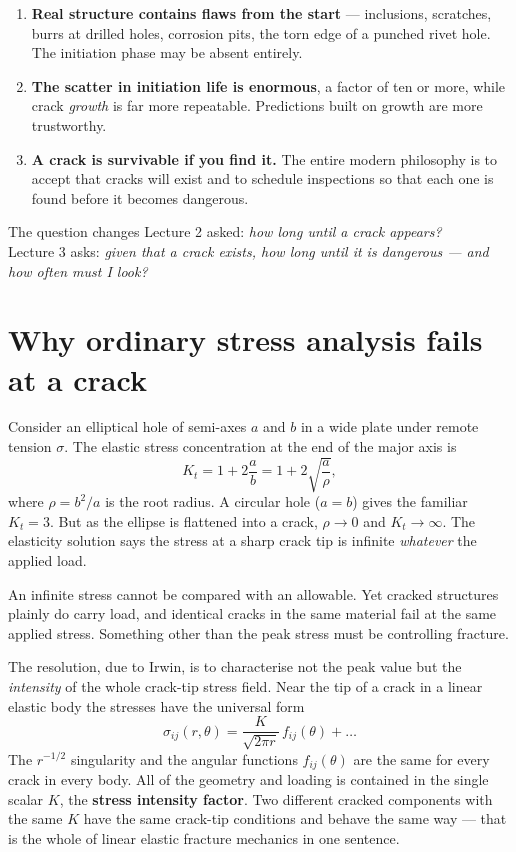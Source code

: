 \documentclass[11pt,a4paper]{article}
\begin{document}
\begin{enumerate}[nosep]
  \item \textbf{Real structure contains flaws from the start} --- inclusions, scratches, burrs at drilled holes, corrosion pits, the torn edge of a punched rivet hole. The initiation phase may be absent entirely.
  \item \textbf{The scatter in initiation life is enormous}, a factor of ten or more, while crack \emph{growth} is far more repeatable. Predictions built on growth are more trustworthy.
  \item \textbf{A crack is survivable if you find it.} The entire modern philosophy is to accept that cracks will exist and to schedule inspections so that each one is found before it becomes dangerous.
\end{enumerate}

\begin{keybox}{The question changes}
Lecture 2 asked: \emph{how long until a crack appears?} \\
Lecture 3 asks: \emph{given that a crack exists, how long until it is dangerous --- and how often must I look?}
\end{keybox}

\section{Why ordinary stress analysis fails at a crack}

Consider an elliptical hole of semi-axes $a$ and $b$ in a wide plate under remote tension $\sigma$. The elastic stress concentration at the end of the major axis is
\begin{equation}
  K_t = 1+2\frac{a}{b} = 1+2\sqrt{\frac{a}{\rho}},
\end{equation}
where $\rho=b^2/a$ is the root radius. A circular hole ($a=b$) gives the familiar $K_t=3$. But as the ellipse is flattened into a crack, $\rho\to0$ and $K_t\to\infty$. The elasticity solution says the stress at a sharp crack tip is infinite \emph{whatever} the applied load.

An infinite stress cannot be compared with an allowable. Yet cracked structures plainly do carry load, and identical cracks in the same material fail at the same applied stress. Something other than the peak stress must be controlling fracture.

The resolution, due to Irwin, is to characterise not the peak value but the \emph{intensity} of the whole crack-tip stress field. Near the tip of a crack in a linear elastic body the stresses have the universal form
\begin{equation}
  \sigma_{ij}(r,\theta)=\frac{K}{\sqrt{2\pi r}}\,f_{ij}(\theta)+\dots
  \label{eq:field}
\end{equation}
The $r^{-1/2}$ singularity and the angular functions $f_{ij}(\theta)$ are the same for every crack in every body. All of the geometry and loading is contained in the single scalar $K$, the \textbf{stress intensity factor}. Two different cracked components with the same $K$ have the same crack-tip conditions and behave the same way --- that is the whole of linear elastic fracture mechanics in one sentence.
\end{document}
